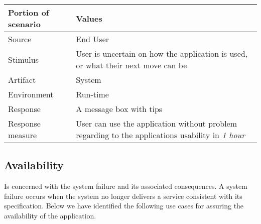 \begin{itemize}
        \begin{tabular}{| l | p{7cm} |}
            \hline
            \rowcolor[gray]{0.8}
            \textbf{Portion of scenario} & \textbf{Values} \\
            \hline
            Source & End User \\
            Stimulus & User is uncertain on how the application is used, or what their next move can be \\
            Artifact & System \\
            Environment & Run-time \\
            Response & A message box with tips \\
            Response measure  & User can use the application without problem regarding to the applications usability in \emph{1 hour}\\
            \hline
        \end{tabular}
\end{itemize}

\subsection{Availability}
Is concerned with the system failure and its associated consequences. A system failure occurs when the system no longer delivers a service consistent with its specification\cite{ProgarkPensum}. Below we have identified the following use cases for assuring the availability of the application.

